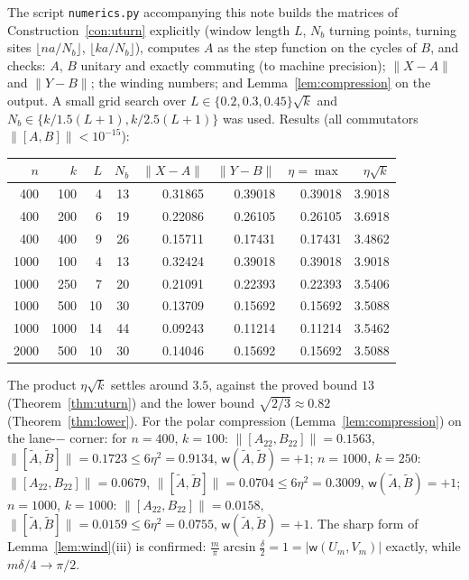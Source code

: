 \documentclass[11pt]{amsart}
\theoremstyle{definition}
\theoremstyle{remark}
\newcommand{\wind}{\mathsf w}
\newcommand{\norm}[1]{\lVert #1\rVert}
\begin{document}
The script \texttt{numerics.py} accompanying this note builds the matrices of Construction~\ref{con:uturn} explicitly (window length $L$, $N_b$ turning points, turning sites $\lfloor na/N_b\rfloor$, $\lfloor ka/N_b\rfloor$), computes $A$ as the step function on the cycles of $B$, and checks: $A$, $B$ unitary and exactly commuting (to machine precision); $\norm{X-A}$ and $\norm{Y-B}$; the winding numbers; and Lemma~\ref{lem:compression} on the output. A small grid search over $L\in\{0.2,0.3,0.45\}\sqrt k$ and $N_b\in\{k/1.5(L+1),k/2.5(L+1)\}$ was used. Results (all commutators $\norm{[A,B]}<10^{-15}$):
\begin{center}
\begin{tabular}{rrrrrrrr}
\toprule
$n$ & $k$ & $L$ & $N_b$ & $\norm{X-A}$ & $\norm{Y-B}$ & $\eta=\max$ & $\eta\sqrt k$\\
\midrule
400 & 100 & 4 & 13 & 0.31865 & 0.39018 & 0.39018 & 3.9018\\
400 & 200 & 6 & 19 & 0.22086 & 0.26105 & 0.26105 & 3.6918\\
400 & 400 & 9 & 26 & 0.15711 & 0.17431 & 0.17431 & 3.4862\\
1000 & 100 & 4 & 13 & 0.32424 & 0.39018 & 0.39018 & 3.9018\\
1000 & 250 & 7 & 20 & 0.21091 & 0.22393 & 0.22393 & 3.5406\\
1000 & 500 & 10 & 30 & 0.13709 & 0.15692 & 0.15692 & 3.5088\\
1000 & 1000 & 14 & 44 & 0.09243 & 0.11214 & 0.11214 & 3.5462\\
2000 & 500 & 10 & 30 & 0.14046 & 0.15692 & 0.15692 & 3.5088\\
\bottomrule
\end{tabular}
\end{center}
The product $\eta\sqrt k$ settles around $3.5$, against the proved bound $13$ (Theorem~\ref{thm:uturn}) and the lower bound $\sqrt{2/3}\approx0.82$ (Theorem~\ref{thm:lower}). For the polar compression (Lemma~\ref{lem:compression}) on the lane-$-$ corner: for $n=400$, $k=100$: $\norm{[A_{22},B_{22}]}=0.1563$, $\norm{[\tilde A,\tilde B]}=0.1723\le6\eta^2=0.9134$, $\wind(\tilde A,\tilde B)=+1$; $n=1000$, $k=250$: $\norm{[A_{22},B_{22}]}=0.0679$, $\norm{[\tilde A,\tilde B]}=0.0704\le6\eta^2=0.3009$, $\wind(\tilde A,\tilde B)=+1$; $n=1000$, $k=1000$: $\norm{[A_{22},B_{22}]}=0.0158$, $\norm{[\tilde A,\tilde B]}=0.0159\le6\eta^2=0.0755$, $\wind(\tilde A,\tilde B)=+1$. The sharp form of Lemma~\ref{lem:wind}(iii) is confirmed: $\frac m\pi\arcsin\frac{\delta}{2}=1=|\wind(U_m,V_m)|$ exactly, while $m\delta/4\to\pi/2$.
\end{document}
